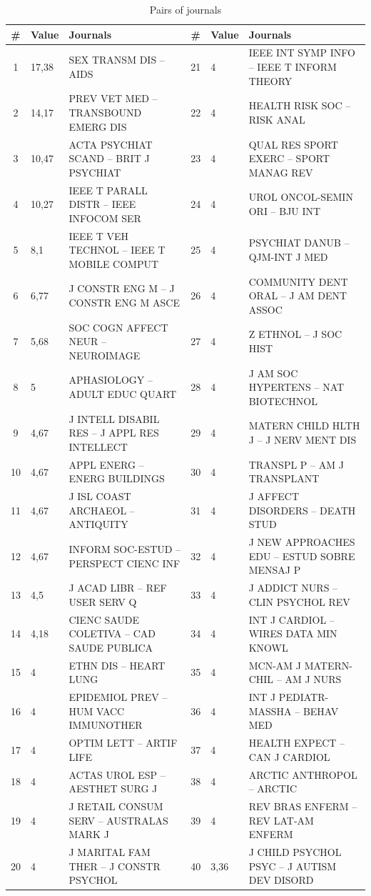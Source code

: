\documentclass[11pt]{article} %
\begin{document}
\begin{table}
\caption{Pairs of journals} \label{jpairs}\medskip
\renewcommand{\arraystretch}{0.9}
\small
\begin{tabular}{c|l|p{6cm}||c|l|p{6cm}|}
\# &	Value&	Journals &	\# &	Value&	Journals \\  \hline 
1&	17,38&	SEX TRANSM DIS --  AIDS       &	21&	4&	IEEE INT SYMP INFO --  IEEE T INFORM THEORY   \\
2&	14,17&	PREV VET MED --  TRANSBOUND EMERG DIS     &	22&	4&	HEALTH RISK SOC --  RISK ANAL      \\
3&	10,47&	ACTA PSYCHIAT SCAND --  BRIT J PSYCHIAT     &	23&	4&	QUAL RES SPORT EXERC --  SPORT MANAG REV    \\
4&	10,27&	IEEE T PARALL DISTR --  IEEE INFOCOM SER    &	24&	4&	UROL ONCOL-SEMIN ORI --  BJU INT      \\
5&	8,1&	IEEE T VEH TECHNOL --  IEEE T MOBILE COMPUT   &	25&	4&	PSYCHIAT DANUB --  QJM-INT J MED      \\
6&	6,77&	J CONSTR ENG M --  J CONSTR ENG M ASCE  &	26&	4&	COMMUNITY DENT ORAL --  J AM DENT ASSOC    \\
7&	5,68&	SOC COGN AFFECT NEUR --  NEUROIMAGE      &	27&	4&	Z ETHNOL --  J SOC HIST      \\
8&	5&	APHASIOLOGY --  ADULT EDUC QUART       &	28&	4&	J AM SOC HYPERTENS --  NAT BIOTECHNOL     \\
9&	4,67&	J INTELL DISABIL RES --  J APPL RES INTELLECT   &	29&	4&	MATERN CHILD HLTH J --  J NERV MENT DIS   \\
10&	4,67&	APPL ENERG --  ENERG BUILDINGS       &	30&	4&	TRANSPL P --  AM J TRANSPLANT      \\
11&	4,67&	J ISL COAST ARCHAEOL --  ANTIQUITY      &	31&	4&	J AFFECT DISORDERS --  DEATH STUD      \\
12&	4,67&	INFORM SOC-ESTUD --  PERSPECT CIENC INF      &	32&	4&	J NEW APPROACHES EDU --  ESTUD SOBRE MENSAJ P   \\
13&	4,5&	J ACAD LIBR --  REF USER SERV Q    &	33&	4&	J ADDICT NURS --  CLIN PSYCHOL REV     \\
14&	4,18&	CIENC SAUDE COLETIVA --  CAD SAUDE PUBLICA     &	34&	4&	INT J CARDIOL --  WIRES DATA MIN KNOWL    \\
15&	4&	ETHN DIS --  HEART LUNG       &	35&	4&	MCN-AM J MATERN-CHIL --  AM J NURS     \\
16&	4&	EPIDEMIOL PREV --  HUM VACC IMMUNOTHER      &	36&	4&	INT J PEDIATR-MASSHA --  BEHAV MED      \\
17&	4&	OPTIM LETT --  ARTIF LIFE       &	37&	4&	HEALTH EXPECT --  CAN J CARDIOL      \\
18&	4&	ACTAS UROL ESP --  AESTHET SURG J     &	38&	4&	ARCTIC ANTHROPOL --  ARCTIC        \\
19&	4&	J RETAIL CONSUM SERV --  AUSTRALAS MARK J    &	39&	4&	REV BRAS ENFERM --  REV LAT-AM ENFERM     \\
20&	4&	J MARITAL FAM THER --  J CONSTR PSYCHOL    &	40&	3,36&	J CHILD PSYCHOL PSYC --  J AUTISM DEV DISORD   \\ \hline 
\end{tabular}\\
\end{table}  
\end{document}
